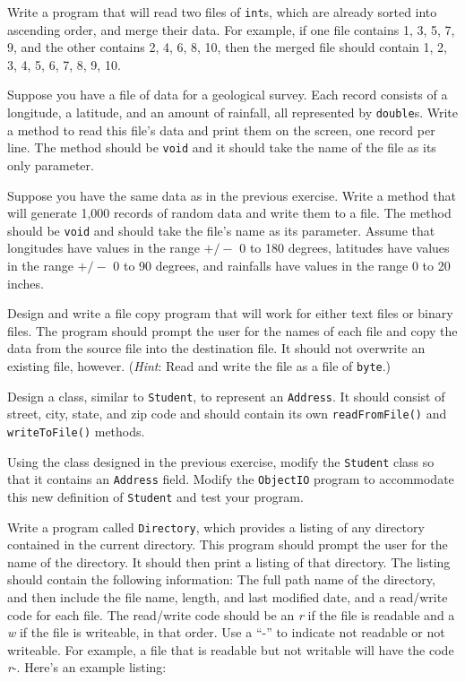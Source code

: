 \begin{EXRtwo}
\item  Write a program that will read two files of {\tt int}s,
which are already sorted into ascending order, and merge their
data.  For example, if one file contains 1, 3, 5, 7, 9, and the
other contains 2, 4, 6, 8, 10, then the merged file should
contain 1, 2, 3, 4, 5, 6, 7, 8, 9, 10.

\item Suppose you have a file of data for a geological survey. Each
record consists of a longitude, a latitude, and an amount of rainfall,
all represented by {\tt double}s.  Write a method to read this file's
data and print them on the screen, one record per line.  The method
should be {\tt void} and it should take the name of the file as its
only parameter.

\item  Suppose you have the same data as in the previous exercise.
Write a method that will generate 1,000 records of random data and
write them to a file.  The method should be {\tt void} and should take the
file's name as its parameter.  Assume that longitudes have values in
the range $+/-$ 0 to 180 degrees, latitudes have values in the range $+/-$
0 to 90 degrees, and rainfalls have values in the range 0 to 20 inches.

\item  Design and write a file copy program that will work for either
text files or binary files.  The program should prompt the user for the
names of each file and copy the data from the source file into the
destination file.  It should not overwrite an existing file,
however.  ({\it Hint}: Read and write the file as a file of {\tt byte}.)

\item  Design a class, similar to {\tt Student}, to represent an
{\tt Address}. It should consist of street, city, state, and zip code
and should contain its own {\tt readFromFile()} and
{\tt writeToFile()} methods.

\item  Using the class designed in the previous exercise, modify
the {\tt Student} class so that it contains an {\tt Address}
field.  Modify the {\tt ObjectIO} program to accommodate this
new definition of {\tt Student} and test your program.

\item  Write a program called {\tt Directory}, which provides
a listing of any directory contained in the current directory.  
This program should prompt the user for the name of the directory.
It should then print a listing of that directory.  The
listing should contain the following information: The full path name
of the directory, and then include the file name, length, and
last modified date, and a read/write code for each file.  The read/write code should
be an {\it r} if the file is readable and a {\it w} if the file is writeable,
in that order.  Use a ``-'' to indicate not readable or not
writeable.  For example, a file that is readable but not writable will
have the code {\it r}-.  Here's an example listing:


\end{EXRtwo}
